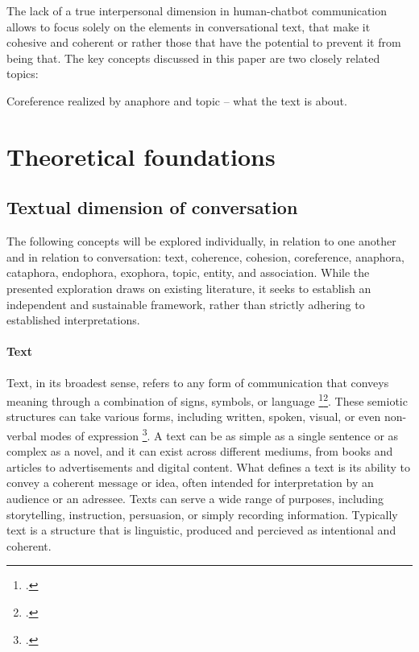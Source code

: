 \documentclass[12pt]{report}
\begin{document}
{\par
The lack of a true interpersonal dimension in human-chatbot communication
allows to focus solely on the elements in conversational text,
that make it cohesive and coherent or rather
those that have the potential to prevent it from being that.
The key concepts discussed in this paper are
two closely related topics:

Coreference realized by anaphore and topic – what the text is about.



\chapter{Theoretical foundations}


\section{Textual dimension of conversation}
\par
    The following concepts will be explored individually, in relation to one another and in relation to conversation: text, coherence, cohesion, coreference, anaphora, cataphora, endophora, exophora, topic, entity, and association. While the presented exploration draws on existing literature, it seeks to establish an independent and sustainable framework, rather than strictly adhering to established interpretations.

\subsubsection{Text}
\par
    Text, in its broadest sense, refers to any form of communication that conveys meaning through a combination of signs, symbols, or language \footcite[p.~7]{hrbacek1994}\footcite{hjelmslev2016}.
    These semiotic structures can take various forms, including written, spoken, visual, or even non-verbal modes of expression \footcite[p.~13]{barthes1977image}.
    A text can be as simple as a single sentence or as complex as a novel, and it can exist across different mediums, from books and articles to advertisements and digital content.
    What defines a text is its ability to convey a coherent message or idea, often intended for interpretation by an audience or an adressee.
    Texts can serve a wide range of purposes, including storytelling, instruction, persuasion, or simply recording information.
    Typically text is a structure that is
    linguistic, produced and percieved as intentional and coherent.

}
\end{document}
